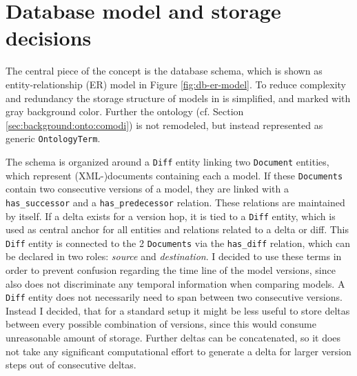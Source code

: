 \section{Database model and storage decisions}
\label{sec:concept:dbmodel}

The central piece of the concept is the database schema, which is shown as entity-relationship (ER) model in Figure \ref{fig:db-er-model}. To reduce complexity and redundancy the storage structure of models in \masymos is simplified, and marked with gray background color. Further the \comodi ontology (cf. Section \ref{sec:background:onto:comodi}) is not remodeled, but instead represented as generic \texttt{OntologyTerm}.

The schema is organized around a \texttt{Diff} entity linking two \texttt{Document} entities, which represent (XML-)documents containing each a model. If these \texttt{Documents} contain two consecutive versions of a model, they are linked with a \texttt{has\_successor} and a \texttt{has\_predecessor} relation.
These relations are maintained by \masymos itself. If a delta exists for a version hop, it is tied to a \texttt{Diff} entity, which is used as central anchor for all entities and relations related to a delta or diff.
This \texttt{Diff} entity is connected to the 2 \texttt{Documents} via the \texttt{has\_diff} relation, which can be declared in two roles: \emph{source} and \emph{destination}. I decided to use these terms in order to prevent confusion regarding the time line of the model versions, since \bives also does not discriminate any temporal information when comparing models.
A \texttt{Diff} entity does not necessarily need to span between two consecutive versions.
Instead I decided, that for a standard setup it might be less useful to store deltas between every possible combination of versions, since this would consume unreasonable amount of storage.
Further deltas can be concatenated, so it does not take any significant computational effort to generate a delta for larger version steps out of consecutive deltas.

